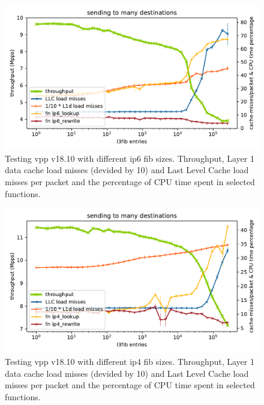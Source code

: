 \begin{figure}[!ht]
\noindent\hspace{0.5mm}\includegraphics[width=\linewidth]{pics/throughput_l3v6_routes_klaipeda32ghz_v3.pdf}
\caption{Testing \Ac{vpp} v18.10 with different \Ac{ip6} \Ac{fib} sizes. Throughput, Layer 1 data cache load misses (devided by 10) and Last Level Cache load misses per packet and the percentage of CPU time spent in selected functions. }
\label{graph:ip6fib}
\end{figure}

\begin{figure}[!ht]
\noindent\hspace{0.5mm}\includegraphics[width=\linewidth]{pics/throughput_l3_routes_klaipeda32ghz_v3.pdf}
\caption{Testing \Ac{vpp} v18.10 with different \Ac{ip4} \Ac{fib} sizes. Throughput, Layer 1 data cache load misses (devided by 10) and Last Level Cache load misses per packet and the percentage of CPU time spent in selected functions.}
\label{graph:ip4fib}
\end{figure}

